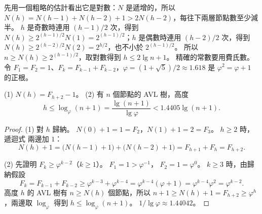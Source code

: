 \begin{center}
\label{fig:bal-fib}
\end{center}

先用一個粗略的估計看出它是對數：$N$ 是遞增的，所以 $N(h) = N(h-1) + N(h-2) + 1 >
2N(h-2)$，每往下兩層節點數至少減半。 $h$ 是奇數時連用 $(h-1)/2$ 次，得到
$N(h) \ge 2^{(h-1)/2} N(1) = 2^{(h-1)/2}$；$h$ 是偶數時連用 $(h-2)/2$ 次，得到
$N(h) \ge 2^{(h-2)/2} N(2) = 2^{h/2}$，也不小於 $2^{(h-1)/2}$。 所以
$n \ge N(h) \ge 2^{(h-1)/2}$，取對數得到 $h \le 2\lg n + 1$。 精確的常數要用費氏數。 令 $F_1 = F_2 =
1$、$F_k = F_{k-1} + F_{k-2}$，$\varphi = (1 + \sqrt5)/2 \approx 1.618$ 是
$\varphi^2 = \varphi + 1$ 的正根。

\begin{theorem}
\label{thm:bal-avl-height}
(1) $N(h) = F_{h+2} - 1$。 (2) 有 $n$ 個節點的 AVL 樹，高度
\[
h \le \log_\varphi(n + 1) = \frac{\lg(n+1)}{\lg \varphi} < 1.4405 \lg(n+1).
\]
\end{theorem}

\begin{proof}
(1) 對 $h$ 歸納。 $N(0) + 1 = 1 = F_2$，$N(1) + 1 = 2 = F_3$。 $h \ge 2$ 時，遞迴式
兩邊加 $1$：
\[
N(h) + 1 = \bigl(N(h-1) + 1\bigr) + \bigl(N(h-2) + 1\bigr) = F_{h+1} + F_h = F_{h+2}.
\]

(2) 先證明 $F_k \ge \varphi^{k-2}$（$k \ge 1$）。 $F_1 = 1 > \varphi^{-1}$，
$F_2 = 1 = \varphi^0$。 $k \ge 3$ 時，由歸納假設
\[
F_k = F_{k-1} + F_{k-2} \ge \varphi^{k-3} + \varphi^{k-4} = \varphi^{k-4}(\varphi + 1)
= \varphi^{k-4} \varphi^2 = \varphi^{k-2}.
\]
高度 $h$ 的 AVL 樹有 $n \ge N(h)$ 個節點，所以
$n + 1 \ge N(h) + 1 = F_{h+2} \ge \varphi^h$，兩邊取 $\log_\varphi$ 得到
$h \le \log_\varphi(n+1)$。 $1 / \lg \varphi \approx 1.44042$。
\end{proof}

